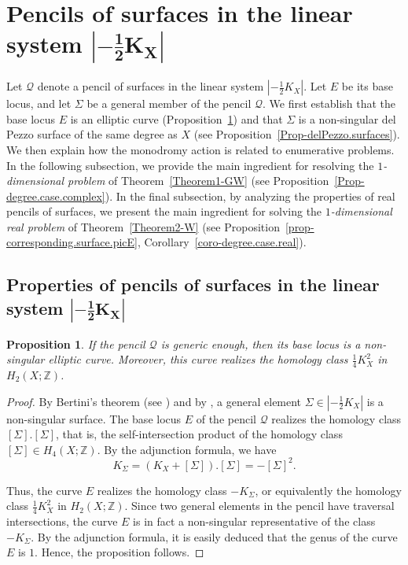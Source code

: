 \documentclass[11pt]{amsart}
\numberwithin{equation}{section}
\theoremstyle{definition}
\theoremstyle{plain}
\newtheorem{proposition}[definition]{Proposition}
\theoremstyle{remark}
\newcommand{\Z}{\mathbb{Z}}
\begin{document}
\section{Pencils of surfaces in the linear system \texorpdfstring{$\boldsymbol{|-\frac{1}{2}K_X|}$}{|-(1/2)K\textunderscore X|}} \label{Section-Pencils}

Let $\mathcal{Q}$ denote a pencil of surfaces in the linear system $|-\frac{1}{2}K_X|$. Let $E$ be its base locus, and let  $\Sigma$ be a general member of the pencil $\mathcal{Q}$. We first establish that the base locus $E$ is an elliptic curve (Proposition~\ref{Prop-E.is.elliptic}) and that $\Sigma$ is a non-singular del Pezzo surface of the same degree as $X$ (see Proposition~\ref{Prop-delPezzo.surfaces}).  We then explain how the monodromy action is related to enumerative problems. In the following subsection, we provide the main ingredient for resolving the \textit{$1$-dimensional problem} of Theorem~\ref{Theorem1-GW} (see Proposition~\ref{Prop-degree.case.complex}). In the final subsection, by analyzing the properties of real pencils of surfaces, we present the main ingredient for solving the \textit{$1$-dimensional real  problem} of Theorem~\ref{Theorem2-W} (see Proposition~\ref{prop-corresponding.surface.picE}, Corollary~\ref{coro-degree.case.real}).

\subsection{Properties of pencils of surfaces in the linear system $\boldsymbol{|-\frac{1}{2}K_X|}$}

\begin{proposition} 
\label{Prop-E.is.elliptic}
 If the pencil $\mathcal{Q}$ is generic enough, then its base locus is a non-singular elliptic curve. Moreover, this curve realizes the homology class $\frac{1}{4}K^2_X$ in $H_2(X;\mathbb{Z})$.
\end{proposition}

\begin{proof}
 By Bertini's theorem (see \cite{griffiths1978principles}) and by \cite[Theorem 1.2]{vsokurov1980smoothness}, a general element $\Sigma \in |-\frac{1}{2}K_X|$ is a non-singular surface.  The base locus $E$ of the pencil $\mathcal{Q}$ realizes the homology class $[\Sigma].[\Sigma]$, that is, the self-intersection product of the homology class $[\Sigma]\in H_4(X;\Z)$. 
 By the adjunction formula, we have 
$$K_\Sigma =(K_X + [\Sigma] ).[\Sigma] = -[\Sigma]^2.$$

Thus, the curve $E$ realizes the homology class $-K_\Sigma$, or equivalently the homology class $\frac{1}{4}K^2_X$ in $H_2(X;\mathbb{Z})$. Since two general elements in the pencil have  traversal intersections, the curve  $E$ is in fact a non-singular representative of the class $-K_\Sigma$. By the adjunction formula, it is easily deduced that the genus of the curve $E$ is $1$. Hence, the proposition follows.
\end{proof}
\end{document}
